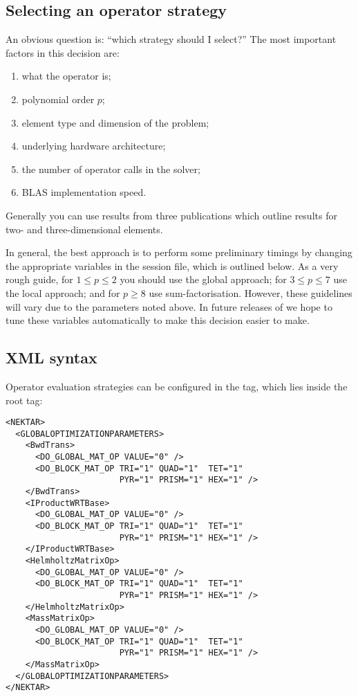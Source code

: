 \subsection{Selecting an operator strategy}

An obvious question is: ``which strategy should I select?'' The most important
factors in this decision are:

\begin{enumerate}
  \item what the operator is;
  \item polynomial order $p$;
  \item element type and dimension of the problem;
  \item underlying hardware architecture;
  \item the number of operator calls in the solver;
  \item BLAS implementation speed.
\end{enumerate}

Generally you can use results from three publications
\cite{VoShKi10,CaShKiKe11a,CaShKiKe11b} which outline results for two- and
three-dimensional elements.

In general, the best approach is to perform some preliminary timings by changing
the appropriate variables in the session file, which is outlined below. As a
very rough guide, for $1 \leq p \leq 2$ you should use the global approach; for
$3\leq p\leq 7$ use the local approach; and for $p \geq 8$ use
sum-factorisation. However, these guidelines will vary due to the parameters
noted above. In future releases of \nekpp we hope to tune these variables
automatically to make this decision easier to make.

\subsection{XML syntax}

Operator evaluation strategies can be configured in the
 tag, which lies inside the root
 tag:

\begin{lstlisting}[style=XMLStyle]
<NEKTAR>
  <GLOBALOPTIMIZATIONPARAMETERS>
    <BwdTrans>
      <DO_GLOBAL_MAT_OP VALUE="0" />
      <DO_BLOCK_MAT_OP TRI="1" QUAD="1"  TET="1"
                       PYR="1" PRISM="1" HEX="1" />
    </BwdTrans>
    <IProductWRTBase>
      <DO_GLOBAL_MAT_OP VALUE="0" />
      <DO_BLOCK_MAT_OP TRI="1" QUAD="1"  TET="1"
                       PYR="1" PRISM="1" HEX="1" />
    </IProductWRTBase>
    <HelmholtzMatrixOp>
      <DO_GLOBAL_MAT_OP VALUE="0" />
      <DO_BLOCK_MAT_OP TRI="1" QUAD="1"  TET="1"
                       PYR="1" PRISM="1" HEX="1" />
    </HelmholtzMatrixOp>
    <MassMatrixOp>
      <DO_GLOBAL_MAT_OP VALUE="0" />
      <DO_BLOCK_MAT_OP TRI="1" QUAD="1"  TET="1"
                       PYR="1" PRISM="1" HEX="1" />
    </MassMatrixOp>
  </GLOBALOPTIMIZATIONPARAMETERS>
</NEKTAR>
\end{lstlisting}


